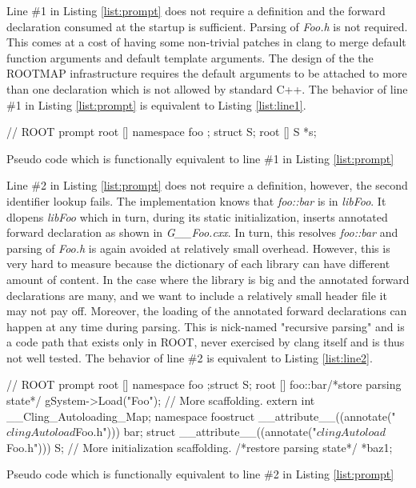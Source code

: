 \documentclass{webofc}
\begin{document}
Line \#1 in Listing \ref{list:prompt} does not require a definition and the forward declaration consumed at the startup is sufficient. Parsing of {\it Foo.h} is not required. This comes at a cost of having some non-trivial patches in clang to merge default function arguments and default template arguments. The design of the the ROOTMAP infrastructure requires the default arguments to be attached to more than one declaration which is not allowed by standard C++. The behavior of line \#1 in Listing \ref{list:prompt} is equivalent to Listing \ref{list:line1}.

\begin{listing}[h]
    \noindent
    \begin{minipage}[h]{.7\textwidth}
    \begin{cppcode*}{}
    // ROOT prompt
    root [] namespace foo { }; struct S;
    root [] S *s;
    \end{cppcode*}
    \end{minipage}
    \caption{Pseudo code which is functionally equivalent to line \#1 in Listing \ref{list:prompt}}
    \label{list:line1}
\end{listing}

Line \#2 in Listing \ref{list:prompt} does not require a definition, however, the second identifier lookup fails. The implementation knows that {\it foo::bar} is in {\it libFoo}. It dlopens {\it libFoo} which in turn, during its static initialization, inserts annotated forward declaration as shown in {\it G\_\_Foo.cxx}. In turn, this resolves {\it foo::bar} and parsing of {\it Foo.h} is again avoided at relatively small overhead. However, this is very hard to measure because the dictionary of each library can have different amount of content. In the case where the library is big and the annotated forward declarations are many, and we want to include a relatively small header file it may not pay off. Moreover, the loading of the annotated forward declarations can happen at any time during parsing. This is nick-named "recursive parsing" and is a code path that exists only in ROOT, never exercised by clang itself and is thus not well tested. The behavior of line \#2 is equivalent to Listing \ref{list:line2}.

\begin{listing}[h]
    \noindent
    \begin{minipage}[h]{.7\textwidth}
    \begin{cppcode*}{}
    // ROOT prompt
    root [] namespace foo { };struct S;
    root [] foo::bar/*store parsing state*/
        gSystem->Load("Foo");
        // More scaffolding.
        extern int __Cling_Autoloading_Map;
        namespace foo{struct __attribute__((annotate("$clingAutoload$Foo.h"))) bar;}
        struct __attribute__((annotate("$clingAutoload$Foo.h"))) S;
        // More initialization scaffolding.
        /*restore parsing state*/ *baz1;
    \end{cppcode*}
    \end{minipage}
    \caption{Pseudo code which is functionally equivalent to line \#2 in Listing \ref{list:prompt}}
    \label{list:line2}
\end{listing}
\end{document}
